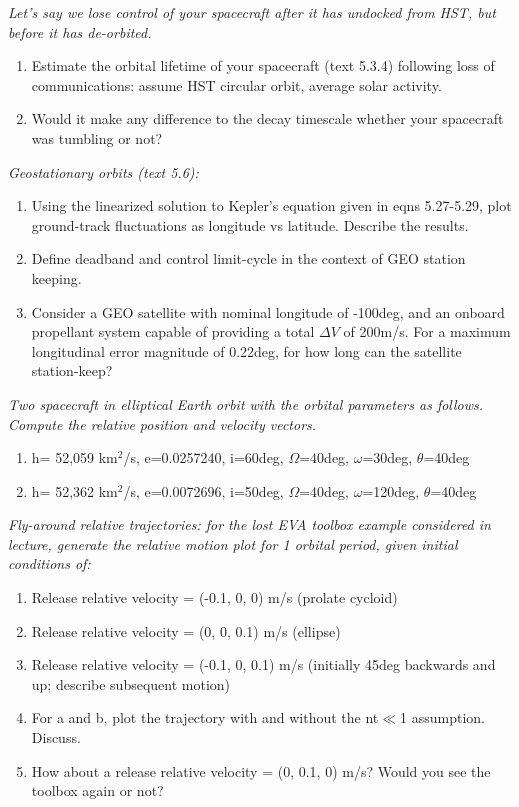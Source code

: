 \documentclass[onecolumn,10pt]{jhwhw}
\begin{document}
\problem{}
\textit{Let’s say we lose control of your spacecraft after it has undocked from HST, but before it has de-orbited.}
\begin{enumerate}
\itemsep0em
\item Estimate the orbital lifetime of your spacecraft (text 5.3.4) following loss of communications: assume HST
circular orbit, average solar activity.
\item Would it make any difference to the decay timescale whether your spacecraft was tumbling or not?
\end{enumerate}
\clearpage

\problem{}
\textit{Geostationary orbits (text 5.6):}
\begin{enumerate}
\itemsep0em
\item Using the linearized solution to Kepler’s equation given in eqns 5.27-5.29, plot ground-track fluctuations as longitude vs latitude. Describe the results.
\item Define deadband and control limit-cycle in the context of GEO station keeping.
\item Consider a GEO satellite with nominal longitude of -100deg, and an onboard propellant system capable of
providing a total $\Delta V$ of 200m/s. For a maximum longitudinal error magnitude of 0.22deg, for how long can the satellite station-keep?
\end{enumerate}
\clearpage

\problem{}
\textit{Two spacecraft in elliptical Earth orbit with the orbital parameters as follows. Compute the relative position and velocity vectors.}
\begin{enumerate}
\itemsep0em
\item h= 52,059 km$^2$/s, e=0.0257240, i=60deg, $\Omega$=40deg, $\omega$=30deg, $\theta$=40deg
\item h= 52,362 km$^2$/s, e=0.0072696, i=50deg, $\Omega$=40deg, $\omega$=120deg, $\theta$=40deg
\end{enumerate}
\clearpage

\problem{}
\textit{Fly-around relative trajectories: for the lost EVA toolbox example considered in lecture, generate the relative motion plot for 1 orbital period, given initial conditions of:}
\begin{enumerate}
\itemsep0em
\item Release relative velocity = (-0.1, 0, 0) m/s (prolate cycloid)
\item Release relative velocity = (0, 0, 0.1) m/s (ellipse)
\item Release relative velocity = (-0.1, 0, 0.1) m/s (initially 45deg backwards and up; describe subsequent motion)
\item For a and b, plot the trajectory with and without the nt$\ll$1 assumption. Discuss.
\item How about a release relative velocity = (0, 0.1, 0) m/s? Would you see the toolbox again or not?
\end{enumerate}
\clearpage
\end{document}
